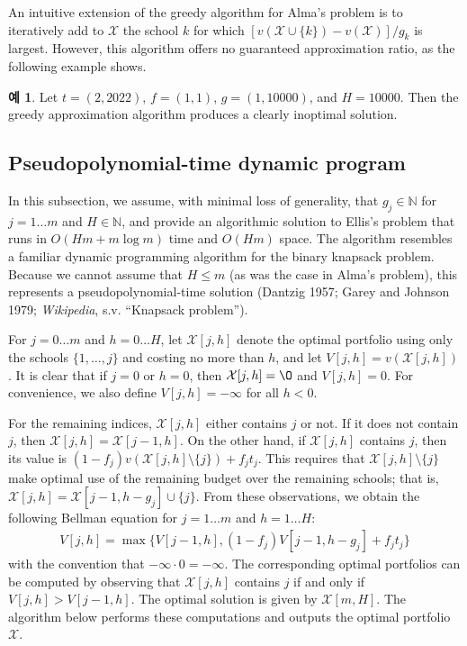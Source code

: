 \documentclass[12pt]{article} %
\theoremstyle{definition}
\newtheorem{example}{Example}
\theoremstyle{definition}
\newtheorem{example}{예}
\begin{document}
An intuitive extension of the greedy algorithm for Alma's problem is to iteratively add to $\mathcal{X}$ the school $k$ for which $[ v(\mathcal{X}\cup\{k\}) - v(\mathcal{X}) ] / g_k$ is largest. However, this algorithm offers no guaranteed approximation ratio, as the following example shows.
\begin{example}
Let $t = (2, 2022)$, $f = (1, 1)$, $g = (1, 10000)$, and $H = 10000$. Then the greedy approximation algorithm produces a clearly inoptimal solution.
\end{example} 

\subsection{Pseudopolynomial-time dynamic program}
In this subsection, we assume, with minimal loss of generality, that $g_j \in \mathbb{N}$ for $j = 1\dots m$ and $H \in\mathbb{N}$, and provide an algorithmic solution to Ellis's problem that runs in $O(Hm + m\log m)$ time and $O(Hm)$ space. The algorithm resembles a familiar dynamic programming algorithm for the binary knapsack problem. Because we cannot assume that $H \leq m$ (as was the case in Alma's problem), this represents a pseudopolynomial-time solution (Dantzig 1957; Garey and Johnson 1979; \emph{Wikipedia}, s.v. ``Knapsack problem'').

For $j = 0 \dots m$ and $h = 0 \dots H$, let $\mathcal{X}[j, h]$ denote the optimal portfolio using only the schools $\{ 1, \dots, j\}$ and costing no more than $h$, and let $V[j,h] = v(\mathcal{X}[j, h])$.  It is clear that if $j=0$ or $h=0$, then $\mathcal{X}[j, h] = \O$ and $V[j, h] = 0$.  For convenience, we also define $V[j, h] = -\infty$ for all $h < 0$.

For the remaining indices, $\mathcal{X}[j, h]$ either contains $j$ or not. If it does not contain $j$, then $\mathcal{X}[j, h] = \mathcal{X}[j-1, h]$. On the other hand, if  $\mathcal{X}[j, h]$ contains $j$, then its value is $(1 - f_j) v(\mathcal{X}[j, h]\setminus \{j\}) + f_j t_j$. This requires that $\mathcal{X}[j, h]\setminus \{j\}$ make optimal use of the remaining budget over the remaining schools; that is, $\mathcal{X}[j, h] = \mathcal{X}[j-1, h - g_j] \cup\{j\}$. From these observations, we obtain the following Bellman equation for $ j = 1\dots m$ and $h = 1\dots H$:
\begin{align}
V[j, h] = \max\bigl\{ V[j-1, h], (1 - f_j) V[j-1, h-g_j] + f_j t_j \bigr\}
\end{align}
with the convention that $ -\infty \cdot 0 = -\infty$. The corresponding optimal portfolios can be computed by observing that $\mathcal{X}[j, h]$ contains $j$ if and only if $V[j, h]> V[j-1, h]$. The optimal solution is given by $\mathcal{X}[m, H]$. The algorithm below performs these computations and outputs the optimal portfolio $\mathcal{X}$. 
\end{document}
